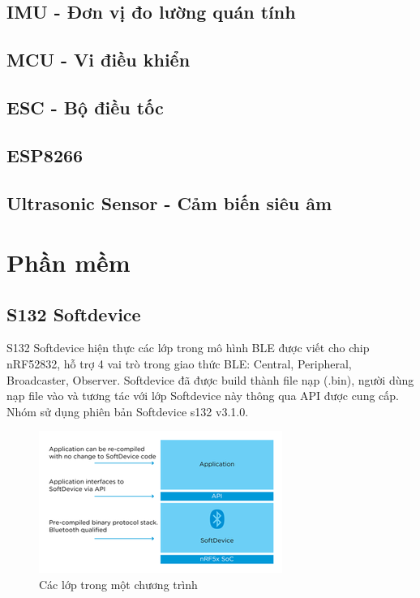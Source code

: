     \subsection{IMU - Đơn vị đo lường quán tính}
    \subsection{MCU - Vi điều khiển}
    \subsection{ESC - Bộ điều tốc}
    \subsection{ESP8266}
    \subsection{Ultrasonic Sensor - Cảm biến siêu âm}
   
   
    \section{Phần mềm}
            \subsection{S132 Softdevice}
        S132 Softdevice hiện thực các lớp trong mô hình BLE được viết cho chip nRF52832, hỗ trợ 4 vai trò trong giao thức BLE: Central, Peripheral, Broadcaster, Observer. Softdevice đã được build thành file nạp (.bin), người dùng nạp file vào và tương tác với lớp Softdevice này thông qua API được cung cấp. Nhóm sử dụng phiên bản Softdevice s132 v3.1.0\cite{softdevice}.
        \begin{figure}[h!]
        	\begin{center}
        		\includegraphics[scale=3.0]{images/SoC-Architecture_large.png}
        		\caption{Các lớp trong một chương trình}
        	\end{center}
        \end{figure}
